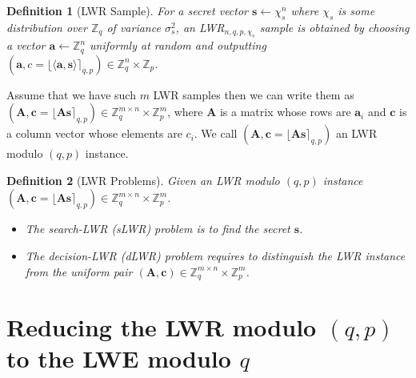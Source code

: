 \documentclass{cta-author}
\newtheorem{definition}{Definition}{}
\begin{document}
\begin{definition}[LWR Sample]
	For a secret vector $\mathbf{s} \leftarrow \chi_s^n$ where $\chi_s$ is some distribution over $\mathbb{Z}_q$ of variance $\sigma^2_s$, an LWR$_{n,q,p,\chi_s}$ sample is obtained by choosing a vector $\mathbf{a} \leftarrow \mathbb{Z}_q^n$ uniformly at random and outputting $(\mathbf{a},c=\lfloor\langle \mathbf{a},\mathbf{s} \rangle \rceil_{q,p})\in \mathbb{Z}_q^n \times \mathbb{Z}_p$.
\end{definition}
Assume that we have such $m$ LWR samples then we can write them as $(\mathbf{A},\mathbf{c}=\lfloor \mathbf{A}\mathbf{s}  \rceil_{q,p}) \in \mathbb{Z}_q^{m \times n} \times \mathbb{Z}_p^m$, where $\mathbf{A}$ is a matrix whose rows are $\mathbf{a}_i$ and $\mathbf{c}$ is a column vector whose elements are $c_i$. We call $(\mathbf{A},\mathbf{c}=\lfloor \mathbf{A}\mathbf{s}  \rceil_{q,p})$ an LWR modulo $(q,p)$ instance.

\begin{definition}[LWR Problems] 
	Given an LWR modulo $(q,p)$ instance  $(\mathbf{A},\mathbf{c}=\lfloor \mathbf{A}\mathbf{s}  \rceil_{q,p}) \in \mathbb{Z}_q^{m \times n} \times \mathbb{Z}_p^m$.
	\begin{itemize}
		\item  The search-LWR (sLWR) problem is to find the secret $\mathbf{s}$. 
		\item The decision-LWR (dLWR) problem requires to distinguish the LWR instance from the uniform pair $(\mathbf{A},\mathbf{c})\in  \mathbb{Z}_q^{m\times n} \times  \mathbb{Z}_p^{m}$.
	\end{itemize}
\end{definition}

\section{Reducing the LWR modulo ${(q,p)}$ to the LWE modulo $q$}  \label{reduce}
\end{document}
